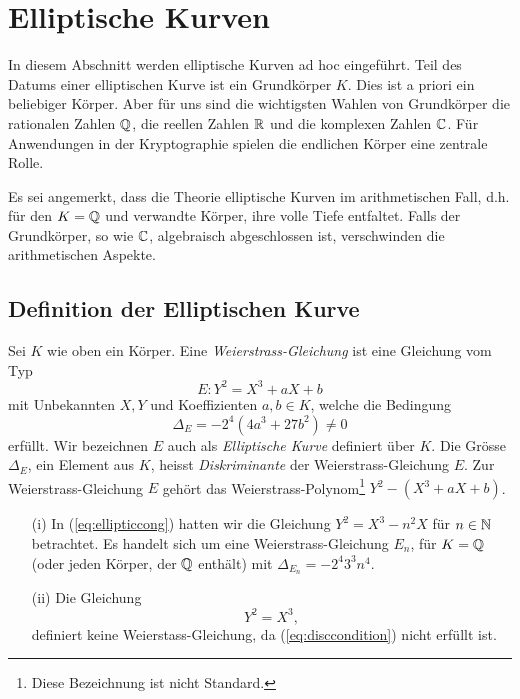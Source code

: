 \chapter{Elliptische Kurven}
\label{kap:ek}

In diesem Abschnitt werden elliptische Kurven ad hoc eingeführt.
Teil des Datums einer elliptischen Kurve ist ein Grundkörper $K$. Dies
ist a priori ein beliebiger Körper. Aber für uns sind die wichtigsten
Wahlen von Grundkörper die rationalen Zahlen ${\mathbb{Q}}$, die reellen Zahlen
${\mathbb{R}}$ und die komplexen Zahlen ${\mathbb{C}}$. Für Anwendungen in der
Kryptographie spielen  die endlichen Körper eine zentrale Rolle.


Es sei angemerkt, dass die Theorie elliptische Kurven im
arithmetischen Fall, d.h. für den  $K={\mathbb{Q}}$ und verwandte Körper, ihre
volle Tiefe entfaltet. Falls der Grundkörper, so wie ${\mathbb{C}}$,
algebraisch abgeschlossen ist, verschwinden die arithmetischen
Aspekte.


\section{Definition der Elliptischen Kurve}

\begin{definition}
  Sei $K$ wie oben ein Körper.
  Eine \emph{Weierstrass-Gleichung} ist eine Gleichung vom Typ
  \begin{equation}
    \label{eq:weierstrass}
    E: Y^2 = X^3 + aX + b
  \end{equation}
  mit Unbekannten $X,Y$ und Koeffizienten $a,b\in K$, welche die
  Bedingung
  \begin{equation}
    \label{eq:disccondition}
    \Delta_E = -2^4(4a^3+27b^2)\not=0
  \end{equation}
  erfüllt. Wir bezeichnen $E$ auch als \emph{Elliptische
    Kurve}
  definiert über $K$.
  Die Grösse $\Delta_E$, ein Element aus $K$, heisst
  \emph{Diskriminante}
  der Weierstrass-Gleichung $E$. Zur Weierstrass-Gleichung $E$ gehört
  das Weierstrass-Polynom\footnote{Diese Bezeichnung ist nicht
    Standard.} $Y^2- (X^3+aX+b)$.
\end{definition}

\begin{beispiele}\leavevmode
  \begin{enumerate}
  \item [(i)] In (\ref{eq:ellipticcong}) hatten wir die Gleichung $Y^2 = X^3-n^2X$
    für $n\in{\mathbb{N}}$ betrachtet. Es handelt sich um eine
    Weierstrass-Gleichung $E_n$, für $K={\mathbb{Q}}$ (oder jeden Körper, der ${\mathbb{Q}}$
    enthält) mit $\Delta_{E_n} = -2^4 3^3 n^4$.
  \item[(ii)] Die Gleichung
    \begin{equation*}
      Y^2 = X^3,
    \end{equation*}
    definiert keine Weierstass-Gleichung, da (\ref{eq:disccondition})
    nicht erfüllt ist.
  \end{enumerate}
\end{beispiele}

